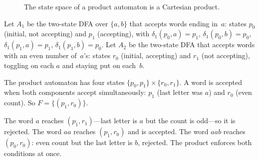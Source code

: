 \begin{figure}[ht]
\centering
{}
\caption{The state space of a product automaton is a Cartesian product.}
\label{fig:product-grid}
\end{figure}

\begin{example}
\label{ex:product-worked}
Let $A_1$ be the two-state DFA over $\{a,b\}$ that accepts words ending
in~$a$: states $p_0$ (initial, not accepting) and $p_1$ (accepting),
with $\delta_1(p_0,a)=p_1$, $\delta_1(p_0,b)=p_0$,
$\delta_1(p_1,a)=p_1$, $\delta_1(p_1,b)=p_0$.  Let $A_2$ be the
two-state DFA that accepts words with an even number of~$a$'s: states
$r_0$ (initial, accepting) and $r_1$ (not accepting), toggling on each
$a$ and staying put on each~$b$.

The product automaton has four states
$\{p_0,p_1\}\times\{r_0,r_1\}$.  A word is accepted when both
components accept simultaneously: $p_1$ (last letter was $a$) and $r_0$
(even count).  So $F=\{(p_1,r_0)\}$.

The word $a$ reaches $(p_1,r_1)$---last letter is $a$ but the count is
odd---so it is rejected.  The word $aa$ reaches $(p_1,r_0)$ and is
accepted.  The word $aab$ reaches $(p_0,r_0)$: even count but the last
letter is $b$, rejected.  The product enforces both conditions at once.
\end{example}

